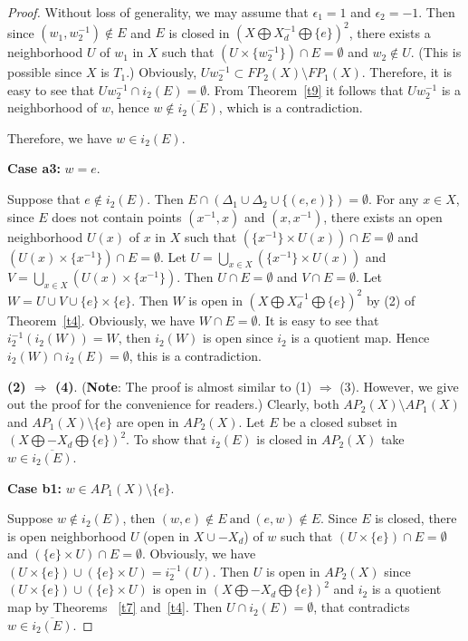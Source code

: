 \documentclass{amsart}
\theoremstyle{definition}
\begin{document}
\begin{proof}
Without loss of generality, we may assume that $\epsilon_{1}=1$ and $\epsilon_{2}=-1$. Then since $(w_{1}, w_{2}^{-1})\not\in E$ and $E$ is closed in $(X\bigoplus X_{d}^{-1}\bigoplus\{e\})^{2}$,  there exists a neighborhood $U$ of $w_{1}$ in $X$ such that
$(U\times \{w_{2}^{-1}\})\cap E=\emptyset$ and $w_{2}\not\in U$. (This is possible since $X$ is $T_{1}$.) Obviously, $U w_{2}^{-1}\subset FP_{2}(X)\setminus FP_{1}(X)$. Therefore, it is easy to see that $U w_{2}^{-1}\cap i_2(E)=\emptyset$. From Theorem~\ref{t9} it follows that $U w_{2}^{-1}$ is a neighborhood of $w$, hence $w\not\in\overline{i_2(E)}$, which is a contradiction.

Therefore, we have $w\in i_2(E)$.


{\bf Case a3:} $w=e$.

Suppose that $e\not\in i_{2}(E)$. Then $E\cap (\Delta_{1}\cup \Delta_{2}\cup\{(e, e)\})=\emptyset$. For any $x\in X$, since $E$ does not contain points $(x^{-1}, x)$ and $(x, x^{-1})$, there exists an open neighborhood $U(x)$ of $x$ in $X$ such that $(\{x^{-1}\}\times U(x))\cap E=\emptyset$ and $(U(x)\times \{x^{-1}\})\cap E=\emptyset$. Let $U=\bigcup_{x\in X}(\{x^{-1}\}\times U(x))$ and $V=\bigcup_{x\in X}(U(x)\times \{x^{-1}\})$. Then $U\cap E=\emptyset$ and $V\cap E=\emptyset$. Let $W=U\cup V\cup\{e\}\times\{e\}$. Then $W$ is open in $(X\bigoplus X_{d}^{-1}\bigoplus\{e\})^{2}$ by (2) of Theorem~\ref{t4}. Obviously, we have $W\cap E=\emptyset$. It is easy to see that $i_2^{-1}(i_2(W))=W$, then $i_2(W)$ is open since $i_2$ is a quotient map. Hence $i_2(W)\cap i_2(E)=\emptyset$, this is a contradiction.

\smallskip

{\bf (2) $\Rightarrow$ (4)}. ({\bf Note}: The proof is almost similar to (1) $\Rightarrow$ (3). However, we give out the proof for the convenience for readers.) Clearly, both $AP_{2}(X)\setminus AP_{1}(X)$ and $AP_{1}(X)\setminus\{e\}$ are open in $AP_{2}(X)$. Let $E$ be a closed subset in $(X\bigoplus -X_{d}\bigoplus\{e\})^{2}$. To show that $i_{2}(E)$ is closed in $AP_{2}(X)$ take $w\in \overline{i_{2}(E)}$.

{\bf Case b1:} $w\in AP_{1}(X)\setminus\{e\}$.

Suppose $w\notin i_2(E)$, then $(w, e)\notin E\ \mbox{and}\ (e, w)\notin E$. Since $E$ is closed, there is open neighborhood $U$ (open in $X\cup -X_{d}$) of $w$ such that $(U\times \{e\})\cap E= \emptyset$ and $(\{e\}\times U)\cap E= \emptyset$. Obviously, we have $(U\times \{e\})\cup (\{e\}\times U)=i_2^{-1}(U)$. Then $U$ is open in $AP_2(X)$ since $(U\times \{e\})\cup (\{e\}\times U)$ is open in $(X\bigoplus -X_{d}\bigoplus\{e\})^{2}$ and $i_2$ is a quotient map by Theorems ~\ref{t7} and~\ref{t4}. Then $U\cap i_2(E)=\emptyset$, that contradicts $w\in \overline{i_2(E)}$.


\end{proof}
\end{document}

